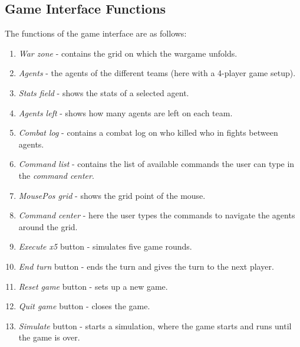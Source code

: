 \subsection*{Game Interface Functions}
The functions of the game interface are as follows:
\begin{enumerate}
	\item \textit{War zone} - contains the grid on which the wargame unfolds.
	\item \textit{Agents} - the agents of the different teams (here with a 4-player game setup).
	\item \textit{Stats field} - shows the stats of a selected agent.
	\item \textit{Agents left} - shows how many agents are left on each team.
	\item \textit{Combat log} - contains a combat log on who killed who in fights between agents.
	\item \textit{Command list} - contains the list of available commands the user can type in the \textit{command center}.
	\item \textit{MousePos grid} - shows the grid point of the mouse.
	\item \textit{Command center} - here the user types the commands to navigate the agents around the grid.
	\item \textit{Execute x5} button - simulates five game rounds.
	\item \textit{End turn} button - ends the turn and gives the turn to the next player.
	\item \textit{Reset game} button - sets up a new game.
	\item \textit{Quit game} button - closes the game.
	\item \textit{Simulate} button - starts a simulation, where the game starts and runs until the game is over.
\end{enumerate}

